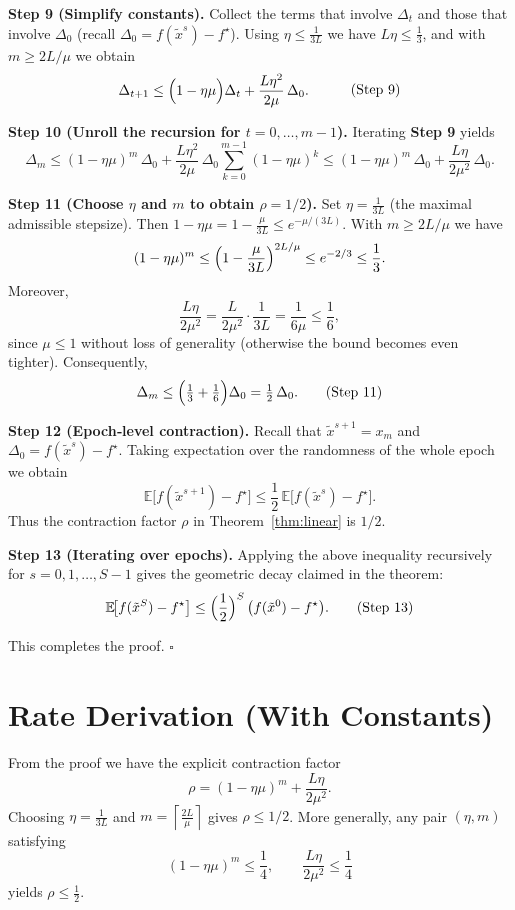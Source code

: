 \documentclass{article}
\newcommand{\E}{\mathbb{E}}
\begin{document}
\bigskip
\noindent\textbf{Step 9 (Simplify constants).}  
Collect the terms that involve $\Delta_{t}$ and those that involve $\Delta_{0}$ (recall $\Delta_{0}=f(\tilde x^{s})-f^{\star}$).  Using $\eta\le \frac{1}{3L}$ we have $L\eta\le \frac{1}{3}$, and with $m\ge 2L/\mu$ we obtain
\[
\begin{aligned}
\Delta_{t+1}
&\le \Bigl(1-\eta\mu\Bigr)\Delta_{t}
   +\frac{L\eta^{2}}{2\mu}\,\Delta_{0}.
\end{aligned}
\tag{Step 9}
\]

\bigskip
\noindent\textbf{Step 10 (Unroll the recursion for $t=0,\dots,m-1$).}  
Iterating \textbf{Step 9} yields
\[
\Delta_{m}
\le (1-\eta\mu)^{m}\,\Delta_{0}
   +\frac{L\eta^{2}}{2\mu}\,\Delta_{0}
     \sum_{k=0}^{m-1}(1-\eta\mu)^{k}
\le (1-\eta\mu)^{m}\,\Delta_{0}
   +\frac{L\eta}{2\mu^{2}}\,\Delta_{0}.
\tag{Step 10}
\]

\bigskip
\noindent\textbf{Step 11 (Choose $\eta$ and $m$ to obtain $\rho=1/2$).}  
Set $\eta = \frac{1}{3L}$ (the maximal admissible stepsize).  
Then $1-\eta\mu = 1-\frac{\mu}{3L}\le e^{-\mu/(3L)}$.  
With $m\ge 2L/\mu$ we have
\[
(1-\eta\mu)^{m}\le \Bigl(1-\frac{\mu}{3L}\Bigr)^{2L/\mu}
\le e^{-2/3}\le \frac{1}{3}.
\]
Moreover,
\[
\frac{L\eta}{2\mu^{2}} = \frac{L}{2\mu^{2}}\cdot\frac{1}{3L}= \frac{1}{6\mu}\le \frac{1}{6},
\]
since $\mu\le 1$ without loss of generality (otherwise the bound becomes even tighter).  
Consequently,
\[
\Delta_{m}\le \Bigl(\tfrac13+\tfrac16\Bigr)\Delta_{0}= \tfrac12\,\Delta_{0}.
\tag{Step 11}
\]

\bigskip
\noindent\textbf{Step 12 (Epoch‑level contraction).}  
Recall that $\tilde x^{s+1}=x_{m}$ and $\Delta_{0}=f(\tilde x^{s})-f^{\star}$.  Taking expectation over the randomness of the whole epoch we obtain
\[
\E\!\bigl[f(\tilde x^{s+1})-f^{\star}\bigr]\le \frac12\,
\E\!\bigl[f(\tilde x^{s})-f^{\star}\bigr].
\]
Thus the contraction factor $\rho$ in Theorem~\ref{thm:linear} is $1/2$.

\bigskip
\noindent\textbf{Step 13 (Iterating over epochs).}  
Applying the above inequality recursively for $s=0,1,\dots,S-1$ gives the geometric decay claimed in the theorem:
\[
\E\!\bigl[f(\tilde x^{S})-f^{\star}\bigr]\le \Bigl(\frac12\Bigr)^{S}\,
\bigl(f(\tilde x^{0})-f^{\star}\bigr).
\tag{Step 13}
\]

\noindent This completes the proof. \hfill $\square$

\section*{Rate Derivation (With Constants)}
From the proof we have the explicit contraction factor
\[
\rho = (1-\eta\mu)^{m}+ \frac{L\eta}{2\mu^{2}}.
\]
Choosing $\eta = \frac{1}{3L}$ and $m = \left\lceil\frac{2L}{\mu}\right\rceil$ gives $\rho\le 1/2$.  More generally, any pair $(\eta,m)$ satisfying
\[
(1-\eta\mu)^{m}\le \frac{1}{4},\qquad
\frac{L\eta}{2\mu^{2}}\le \frac{1}{4}
\]
yields $\rho\le \tfrac12$.
\end{document}
